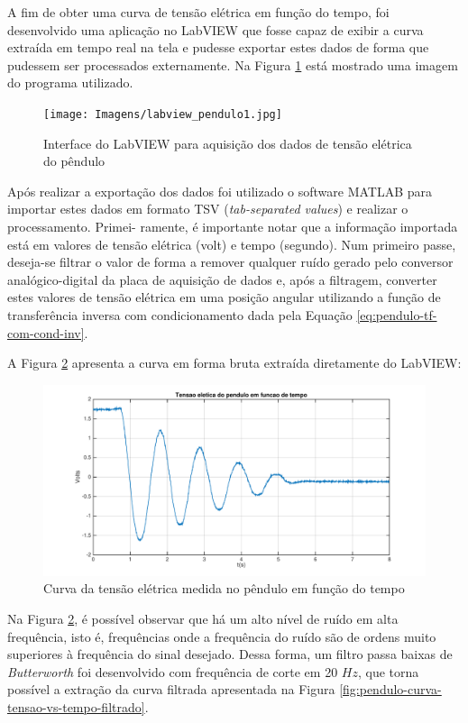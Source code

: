 \documentclass[a4paper]{instrumentacao}
\begin{document}
A fim de obter uma curva de tensão elétrica em função do tempo, foi desenvolvido uma aplicação no LabVIEW que fosse capaz de exibir a curva extraída em tempo real na tela e pudesse exportar estes dados de forma que pudessem ser processados externamente. Na Figura \ref{fig:pendulo-LabVIEW} está mostrado uma imagem do programa utilizado.

\begin{figure}[H]
\centering
\texttt{[image: Imagens/labview\_pendulo1.jpg]}
\caption{Interface do LabVIEW para aquisição dos dados de tensão elétrica do pêndulo}
\label{fig:pendulo-LabVIEW}
\end{figure}

Após realizar a exportação dos dados foi utilizado o software MATLAB para importar estes dados em formato TSV (\textit{tab-separated values}) e realizar o processamento. Primei- ramente, é importante notar que a informação importada está em valores de tensão elétrica (volt) e tempo (segundo). Num primeiro passe, deseja-se filtrar o valor de forma a remover qualquer ruído gerado pelo conversor analógico-digital da placa de aquisição de dados e, após a filtragem, converter estes valores de tensão elétrica em uma posição angular utilizando a função de transferência inversa com condicionamento dada pela Equação \ref{eq:pendulo-tf-com-cond-inv}.

A Figura \ref{fig:pendulo-curva-tensao-vs-tempo} apresenta a curva em forma bruta extraída diretamente do LabVIEW:

\begin{figure}[H]
\centering
\includegraphics[width=\textwidth]{time-plot-raw.pdf}
\caption{Curva da tensão elétrica medida no pêndulo em função do tempo}
\label{fig:pendulo-curva-tensao-vs-tempo}
\end{figure}

Na Figura \ref{fig:pendulo-curva-tensao-vs-tempo}, é possível observar que há um alto nível de ruído em alta frequência, isto é, frequências onde a frequência do ruído são de ordens muito superiores à frequência do sinal desejado. Dessa forma, um filtro passa baixas de \textit{Butterworth} foi desenvolvido com frequência de corte em 20 $Hz$, que torna possível a extração da curva filtrada apresentada na Figura \ref{fig:pendulo-curva-tensao-vs-tempo-filtrado}.
\end{document}
